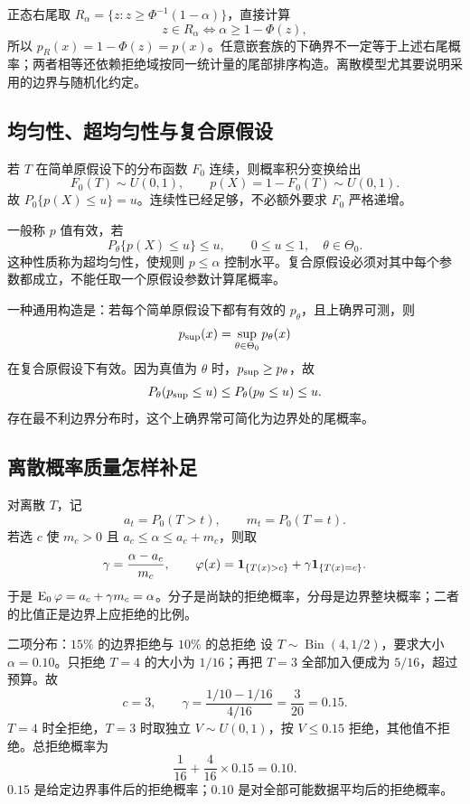 正态右尾取 $R_\alpha=\{z:z\ge\Phi^{-1}(1-\alpha)\}$，直接计算
\[
 z\in R_\alpha
 \iff \alpha\ge1-\Phi(z),
\]
所以 $p_R(x)=1-\Phi(z)=p(x)$。任意嵌套族的下确界不一定等于上述右尾概率；两者相等还依赖拒绝域按同一统计量的尾部排序构造。离散模型尤其要说明采用的边界与随机化约定。

\subsection{均匀性、超均匀性与复合原假设}

若 $T$ 在简单原假设下的分布函数 $F_0$ 连续，则概率积分变换给出
\[
 F_0(T)\sim U(0,1),\qquad p(X)=1-F_0(T)\sim U(0,1).
\]
故 $P_0\{p(X)\le u\}=u$。连续性已经足够，不必额外要求 $F_0$ 严格递增。

一般称 $p$ 值有效，若
\[
 P_\theta\{p(X)\le u\}\le u,
 \qquad 0\le u\le1,\quad\theta\in\Theta_0.
\]
这种性质称为超均匀性，使规则 $p\le\alpha$ 控制水平。复合原假设必须对其中每个参数都成立，不能任取一个原假设参数计算尾概率。

一种通用构造是：若每个简单原假设下都有有效的 $p_\theta$，且上确界可测，则
\[
 p_{\rm sup}(x)=\sup_{\theta\in\Theta_0}p_\theta(x)
\]
在复合原假设下有效。因为真值为 $\theta$ 时，$p_{\rm sup}\ge p_\theta$，故
\[
 P_\theta(p_{\rm sup}\le u)\le P_\theta(p_\theta\le u)\le u.
\]
存在最不利边界分布时，这个上确界常可简化为边界处的尾概率。

\subsection{离散概率质量怎样补足}

对离散 $T$，记
\[
 a_t=P_0(T>t),\qquad m_t=P_0(T=t).
\]
若选 $c$ 使 $m_c>0$ 且 $a_c\le\alpha\le a_c+m_c$，则取
\[
 \gamma=\frac{\alpha-a_c}{m_c},\qquad
 \varphi(x)=\mathbf 1_{\{T(x)>c\}}+\gamma\mathbf 1_{\{T(x)=c\}}.
\]
于是 $\operatorname{E}_0\varphi=a_c+\gamma m_c=\alpha$。分子是尚缺的拒绝概率，分母是边界整块概率；二者的比值正是边界上应拒绝的比例。

\begin{examplebox}{二项分布：$15\%$ 的边界拒绝与 $10\%$ 的总拒绝}
设 $T\sim\operatorname{Bin}(4,1/2)$，要求大小 $\alpha=0.10$。只拒绝 $T=4$ 的大小为 $1/16$；再把 $T=3$ 全部加入便成为 $5/16$，超过预算。故
\[
 c=3,\qquad
 \gamma=\frac{1/10-1/16}{4/16}=\frac3{20}=0.15.
\]
$T=4$ 时全拒绝，$T=3$ 时取独立 $V\sim U(0,1)$，按 $V\le0.15$ 拒绝，其他值不拒绝。总拒绝概率为
\[
 \frac1{16}+\frac4{16}\times0.15=0.10.
\]
$0.15$ 是给定边界事件后的拒绝概率；$0.10$ 是对全部可能数据平均后的拒绝概率。
\end{examplebox}

